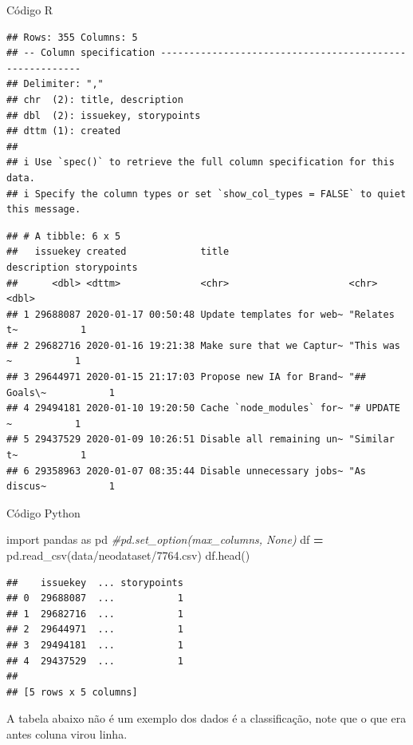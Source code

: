 \documentclass[
]{book}
\newenvironment{Shaded}{\begin{snugshade}}{\end{snugshade}}
\newcommand{\CommentTok}[1]{\textcolor[rgb]{0.56,0.35,0.01}{\textit{#1}}}
\newcommand{\ImportTok}[1]{#1}
\newcommand{\NormalTok}[1]{#1}
\newcommand{\OperatorTok}[1]{\textcolor[rgb]{0.81,0.36,0.00}{\textbf{#1}}}
\newcommand{\StringTok}[1]{\textcolor[rgb]{0.31,0.60,0.02}{#1}}
\begin{document}
Código R

\begin{verbatim}
## Rows: 355 Columns: 5
## -- Column specification --------------------------------------------------------
## Delimiter: ","
## chr  (2): title, description
## dbl  (2): issuekey, storypoints
## dttm (1): created
## 
## i Use `spec()` to retrieve the full column specification for this data.
## i Specify the column types or set `show_col_types = FALSE` to quiet this message.
\end{verbatim}

\begin{verbatim}
## # A tibble: 6 x 5
##   issuekey created             title                     description storypoints
##      <dbl> <dttm>              <chr>                     <chr>             <dbl>
## 1 29688087 2020-01-17 00:50:48 Update templates for web~ "Relates t~           1
## 2 29682716 2020-01-16 19:21:38 Make sure that we Captur~ "This was ~           1
## 3 29644971 2020-01-15 21:17:03 Propose new IA for Brand~ "## Goals\~           1
## 4 29494181 2020-01-10 19:20:50 Cache `node_modules` for~ "# UPDATE ~           1
## 5 29437529 2020-01-09 10:26:51 Disable all remaining un~ "Similar t~           1
## 6 29358963 2020-01-07 08:35:44 Disable unnecessary jobs~ "As discus~           1
\end{verbatim}

Código Python

\begin{Shaded}
\begin{Highlighting}[]
\ImportTok{import}\NormalTok{ pandas }\ImportTok{as}\NormalTok{ pd}
\CommentTok{\#pd.set\_option(\textquotesingle{}max\_columns\textquotesingle{}, None)}
\NormalTok{df }\OperatorTok{=}\NormalTok{ pd.read\_csv(}\StringTok{\textquotesingle{}data/neodataset/7764.csv\textquotesingle{}}\NormalTok{)}
\NormalTok{df.head()}
\end{Highlighting}
\end{Shaded}

\begin{verbatim}
##    issuekey  ... storypoints
## 0  29688087  ...           1
## 1  29682716  ...           1
## 2  29644971  ...           1
## 3  29494181  ...           1
## 4  29437529  ...           1
## 
## [5 rows x 5 columns]
\end{verbatim}

A tabela abaixo não é um exemplo dos dados é a classificação, note que o que era antes coluna virou linha.
\end{document}
